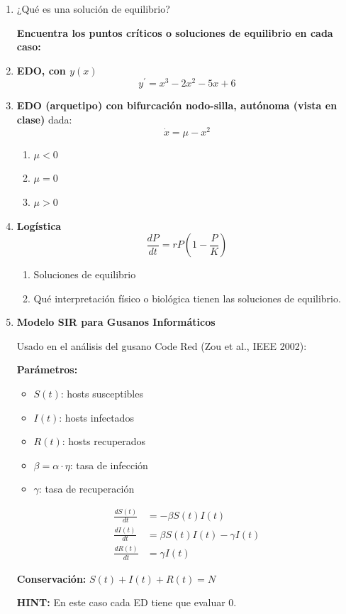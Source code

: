 \begin{enumerate}[label=\arabic*., leftmargin=*]
    \item ¿Qué es una solución de equilibrio?
    
    \vspace{0.3cm}
    \noindent \textbf{Encuentra los puntos críticos o soluciones de equilibrio en cada caso:}
    \vspace{0.2cm}
    
    \item \textbf{EDO, con $y(x)$}
    \[ y^{\prime}=x^{3}-2x^{2}-5x+6 \]

    \item \textbf{EDO (arquetipo) con bifurcación nodo-silla, autónoma (vista en clase)} dada:
    \[ \dot{x}=\mu-x^{2} \]
    \begin{enumerate}[label=(\alph*), leftmargin=*]
        \item $\mu<0$
        \item $\mu=0$
        \item $\mu>0$
    \end{enumerate}

    \item \textbf{Logística}
    \[ \frac{dP}{dt}=rP\left(1-\frac{P}{K}\right) \]
    \begin{enumerate}[label=(\alph*), leftmargin=*]
        \item Soluciones de equilibrio
        \item Qué interpretación físico o biológica tienen las soluciones de equilibrio.
    \end{enumerate}

    \item \textbf{Modelo SIR para Gusanos Informáticos}
    
    Usado en el análisis del gusano Code Red (Zou et al., IEEE 2002):
    
    \textbf{Parámetros:}
    \begin{itemize}[leftmargin=*]
        \item $S(t)$: hosts susceptibles
        \item $I(t)$: hosts infectados
        \item $R(t)$: hosts recuperados
        \item $\beta=\alpha\cdot\eta$: tasa de infección
        \item $\gamma$: tasa de recuperación
    \end{itemize}
    
    \begin{align*}
        \frac{dS(t)}{dt} &= -\beta S(t)I(t) \\
        \frac{dI(t)}{dt} &= \beta S(t)I(t)-\gamma I(t) \\
        \frac{dR(t)}{dt} &= \gamma I(t)
    \end{align*}
    
    \textbf{Conservación:} $S(t)+I(t)+R(t)=N$
    
    \textbf{HINT:} En este caso cada ED tiene que evaluar 0.
\end{enumerate}

